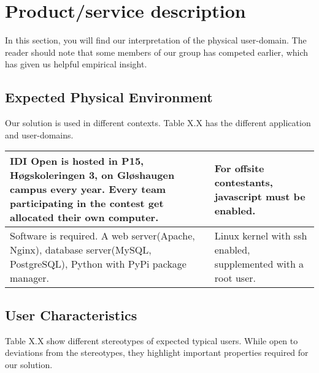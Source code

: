 \section{Product/service description}
In this section, you will find our interpretation of the physical user-domain.
The reader should note that some members of our group has competed earlier,
which has given us helpful empirical insight.

\subsection{Expected Physical Environment}
Our solution is used in different contexts. Table X.X has the different
application and user-domains.

\begin{tabular}{|m{3.1712599in}|m{3.1712599in}|}
\hline
IDI Open is hosted in P15, Høgskoleringen 3, on
Gløshaugen campus every year. Every team participating in the
contest get allocated their own computer. &
For offsite contestants, javascript must be enabled.\\
\hline
Software is required. A web server(Apache, Nginx), database
server(MySQL, PostgreSQL), Python with PyPi package manager.
 &
Linux kernel with ssh enabled, supplemented with a root user.
\\\hline
\end{tabular}

\subsection{User Characteristics}
Table X.X show different stereotypes of expected typical users. While open to
deviations from the stereotypes, they highlight important properties required
for our solution.

